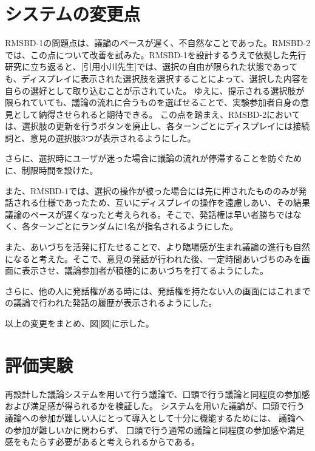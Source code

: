 \documentclass[11pt, a4paper]{jreport} %
\begin{document}
\section{システムの変更点}
RMSBD-1の問題点は、議論のペースが遅く、不自然なことであった。RMSBD-2では、この点について改善を試みた。RMSBD-1を設計するうえで依拠した先行研究に立ち返ると、[引用小川先生]では、選択の自由が限られた状態であっても、ディスプレイに表示された選択肢を選択することによって、選択した内容を自らの選好として取り込むことが示されていた。
ゆえに、提示される選択肢が限られていても、議論の流れに合うものを選ばせることで、実験参加者自身の意見として納得させられると期待できる。
この点を踏まえ、RMSBD-2においては、選択肢の更新を行うボタンを廃止し、各ターンごとにディスプレイには接続詞と、意見の選択肢3つが表示されるようにした。

さらに、選択時にユーザが迷った場合に議論の流れが停滞することを防ぐために、制限時間を設けた。


また、RMSBD-1では、選択の操作が被った場合には先に押されたもののみが発話される仕様であったため、互いにディスプレイの操作を遠慮しあい、その結果議論のペースが遅くなったと考えられる。そこで、発話権は早い者勝ちではなく、各ターンごとにランダムに1名が指名されるようにした。


また、あいづちを活発に打たせることで、より臨場感が生まれ議論の進行も自然になると考えた。そこで、意見の発話が行われた後、一定時間あいづちのみを画面に表示させ、議論参加者が積極的にあいづちを打てるようにした。


さらに、他の人に発話権がある時には、発話権を持たない人の画面にはこれまでの議論で行われた発話の履歴が表示されるようにした。


以上の変更をまとめ、図[図]に示した。



\section{評価実験}
再設計した議論システムを用いて行う議論で、口頭で行う議論と同程度の参加感および満足感が得られるかを検証した。
システムを用いた議論が、口頭で行う議論への参加が難しい人にとって導入として十分に機能するためには、
議論への参加が難しいかに関わらず、
口頭で行う通常の議論と同程度の参加感や満足感をもたらす必要があると考えられるからである。
\end{document}
